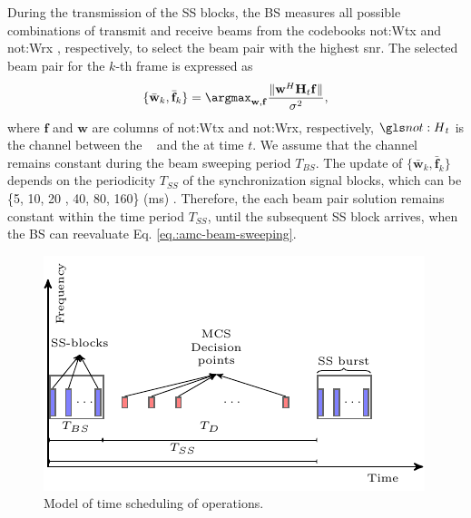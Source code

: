During the transmission of the SS blocks, the BS measures all possible combinations of transmit and receive beams from the codebooks \gls{not:Wtx}  and \gls{not:Wrx} , respectively,  to select the beam pair with the highest \gls{snr}.
%
The selected beam pair for the $k$-th frame is expressed as
\begin{equation}
\label{eq.:amc-beam-sweeping}
  \{ \bar{\mathbf{w}}_k, \bar{\mathbf{f}}_k \}= \argmax_{\mathbf{w}, \mathbf{f}} \frac{\|\mathbf{w}^H \mathbf{H}_t \mathbf{f}\|}{\sigma ^2},
\end{equation}
%
\noindent where $\mathbf{f}$ and $\mathbf{w}$ are columns of \gls{not:Wtx} and \gls{not:Wrx}, respectively,  $\channel _t $  is the channel between the \bs~ and the \ue at time $t$. We assume that the channel remains constant during the beam sweeping period $T_{BS}$.
%
The update of $\{ \bar{\mathbf{w}}_k, \bar{\mathbf{f}}_k \}$ depends on the periodicity $T_{SS}$ of the synchronization signal blocks, which can be  \{5, 10, 20 , 40, 80, 160\} (ms) \cite{giordani21}.
%
Therefore, the each beam pair solution remains constant within the time period $T_{SS}$, until the subsequent SS block arrives, when the BS can reevaluate Eq. \eqref{eq.:amc-beam-sweeping}.
%


\begin{figure}[tb]
\centerline{\includegraphics[width=\columnwidth]{figures/chp_amc/amc_q_learning.pdf}}
\caption{Model of time scheduling of operations.}
\label{fig:amc-system-timing}
\end{figure}


